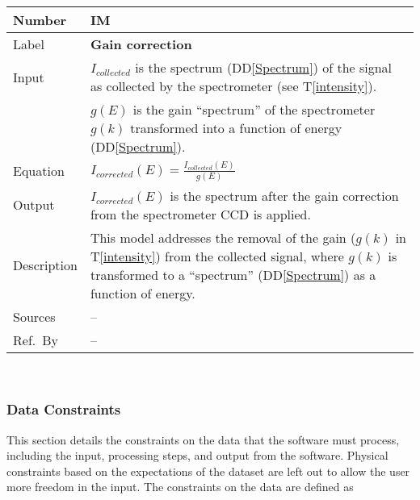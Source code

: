 \documentclass[12pt]{article}
\newcommand{\colAwidth}{0.13\textwidth}
\newcommand{\colBwidth}{0.82\textwidth}
\newcommand{\ddref}[1]{DD\ref{#1}}
\newcommand{\tref}[1]{T\ref{#1}}
\newcounter{instnum} %
\begin{document}
\noindent
\begin{minipage}{\textwidth}
	\renewcommand*{\arraystretch}{1.5}
	\begin{tabular}{| p{\colAwidth} | p{\colBwidth}|}
		\hline
		\rowcolor[gray]{0.9}
		Number& IM{instnum}\theinstnum \label{gain}\\
		\hline
		Label& \bf Gain correction\\
		\hline
		Input & $I_{collected}$ is the spectrum (\ddref{Spectrum}) of the signal as
collected by the spectrometer (see \tref{intensity}).\\
		& $g(E)$ is the gain ``spectrum'' of the spectrometer $g(k)$ transformed into
a function of energy (\ddref{Spectrum}).\\
		\hline
		Equation & $I_{corrected}(E)=\frac{I_{collected}(E)}{g(E)}$\\
		\hline
		Output& $I_{corrected}(E)$ is the spectrum after the gain correction from the
spectrometer CCD is applied.\\
		\hline
		Description & This model addresses the removal of the gain ($g(k)$ in
\tref{intensity}) from the collected signal, where $g(k)$ is transformed to a
``spectrum'' (\ddref{Spectrum}) as a function of energy.\\
		\hline
		Sources & --\\
		\hline
		Ref.\ By & --\\
		\hline
	\end{tabular}
\end{minipage}\\

\subsubsection{Data Constraints} \label{sec_DataConstraints}    
This section details the constraints on the data that the software must process,
including the input, processing steps, and output from the software. Physical
constraints based on the expectations of the dataset are left out to allow the
user more freedom in the input. The constraints on the data are defined as
\end{document}
